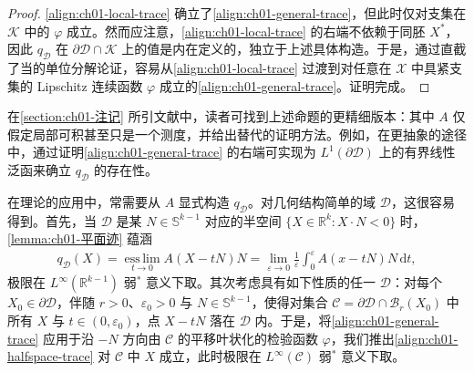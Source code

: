 \documentclass[../../main.tex]{subfiles}
\begin{document}
\begin{proof}
\cref{align:ch01-local-trace} 确立了\cref{align:ch01-general-trace}，但此时仅对支集在 $\mathscr{K}$ 中的 $\varphi$ 成立。然而应注意，\cref{align:ch01-local-trace} 的右端不依赖于同胚 $X^{*}$，因此 $q_{\mathscr{D}}$ 在 $\partial\mathscr{D}\cap\mathscr{K}$ 上的值是内在定义的，独立于上述具体构造。于是，通过直截了当的单位分解论证，容易从\cref{align:ch01-local-trace} 过渡到对任意在 $\mathscr{X}$ 中具紧支集的 Lipschitz 连续函数 $\varphi$ 成立的\cref{align:ch01-general-trace}。证明完成。
\end{proof}

在\cref{section:ch01-注记} 所引文献中，读者可找到上述命题的更精细版本：其中 $A$ 仅假定局部可积甚至只是一个测度，并给出替代的证明方法。例如，在更抽象的途径中，通过证明\cref{align:ch01-general-trace} 的右端可实现为 $L^{1}(\partial\mathscr{D})$ 上的有界线性泛函来确立 $q_{\mathscr{D}}$ 的存在性。

\begin{remark}\label{remark:ch01-显式迹构造}
在理论的应用中，常需要从 $A$ 显式构造 $q_{\mathscr{D}}$。对几何结构简单的域 $\mathscr{D}$，这很容易得到。首先，当 $\mathscr{D}$ 是某 $N\in\mathbb{S}^{k-1}$ 对应的半空间 $\{X\in\mathbb{R}^{k}:X\cdot N<0\}$ 时，\cref{lemma:ch01-平面迹} 蕴涵
\begin{align}
q_{\mathscr{D}}(X)=\operatorname*{ess\,lim}_{t\to 0}A(X-tN)N=\lim_{\varepsilon\to 0}\frac{1}{\varepsilon}\int_{0}^{\varepsilon}A(x-tN)N\,\mathrm{d}t,\label{align:ch01-halfspace-trace}
\end{align}
极限在 $L^{\infty}(\mathbb{R}^{k-1})$ 弱$^{*}$ 意义下取。其次考虑具有如下性质的任一 $\mathscr{D}$：对每个 $X_{0}\in\partial\mathscr{D}$，伴随 $r>0$、$\varepsilon_{0}>0$ 与 $N\in\mathbb{S}^{k-1}$，使得对集合 $\mathscr{C}=\partial\mathscr{D}\cap\mathscr{B}_{r}(X_{0})$ 中所有 $X$ 与 $t\in(0,\varepsilon_{0})$，点 $X-tN$ 落在 $\mathscr{D}$ 内。于是，将\cref{align:ch01-general-trace} 应用于沿 $-N$ 方向由 $\mathscr{C}$ 的平移叶状化的检验函数 $\varphi$，我们推出\cref{align:ch01-halfspace-trace} 对 $\mathscr{C}$ 中 $X$ 成立，此时极限在 $L^{\infty}(\mathscr{C})$ 弱$^{*}$ 意义下取。
\end{remark}
\end{document}
